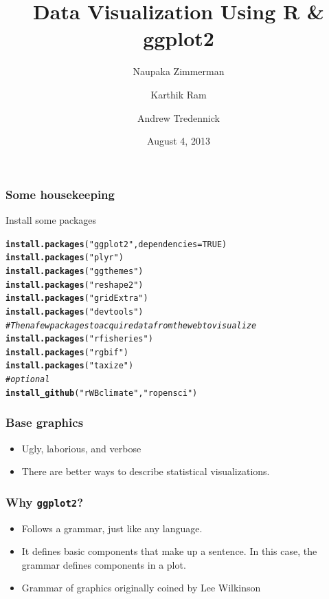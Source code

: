 \documentclass{beamer}\usepackage[]{graphicx}\usepackage[]{color}
\makeatletter
\newcommand{\hlstr}[1]{\textcolor[rgb]{0.192,0.494,0.8}{#1}}%
\newcommand{\hlcom}[1]{\textcolor[rgb]{0.678,0.584,0.686}{\textit{#1}}}%
\newcommand{\hlkwd}[1]{\textcolor[rgb]{0.737,0.353,0.396}{\textbf{#1}}}%
\newenvironment{kframe}{%
 \def\at@end@of@kframe{}%
 \ifinner\ifhmode%
  \def\at@end@of@kframe{\end{minipage}}%
  \begin{minipage}{\columnwidth}%
 \fi\fi%
 \def\FrameCommand##1{\hskip\@totalleftmargin \hskip-\fboxsep
 \colorbox{shadecolor}{##1}\hskip-\fboxsep
     \hskip-\linewidth \hskip-\@totalleftmargin \hskip\columnwidth}%
 \MakeFramed {\advance\hsize-\width
   \@totalleftmargin\z@ \linewidth\hsize
   \@setminipage}}%
 {\par\unskip\endMakeFramed%
 \at@end@of@kframe}
\newenvironment{knitrout}{}{} %
\makeatother
\begin{document}


\title{Data Visualization Using R \& ggplot2}
\author{Naupaka Zimmerman \and Karthik Ram \and Andrew Tredennick}
\date{August 4, 2013}
\maketitle


\begin{frame}[fragile]
\frametitle{Some housekeeping}
Install some packages
\begin{knitrout}\footnotesize
{}\color{fgcolor}\begin{kframe}
\begin{alltt}
\hlkwd{install.packages}(\hlstr{"ggplot2"}, dependencies = TRUE)
\hlkwd{install.packages}(\hlstr{"plyr"})
\hlkwd{install.packages}(\hlstr{"ggthemes"})
\hlkwd{install.packages}(\hlstr{"reshape2"})
\hlkwd{install.packages}(\hlstr{"gridExtra"})
\hlkwd{install.packages}(\hlstr{"devtools"})
\hlcom{# Then a few packages to acquire data from the web to visualize}
\hlkwd{install.packages}(\hlstr{"rfisheries"})
\hlkwd{install.packages}(\hlstr{"rgbif"})
\hlkwd{install.packages}(\hlstr{"taxize"})
\hlcom{# optional}
\hlkwd{install_github}(\hlstr{"rWBclimate"}, \hlstr{"ropensci"})
\end{alltt}
\end{kframe}
\end{knitrout}

\end{frame}


\begin{frame}[fragile]
\frametitle{Base graphics}
\begin{itemize}
\item Ugly, laborious, and verbose\\
\item There are better ways to describe statistical visualizations.\\
\end{itemize}
\end{frame}

\begin{frame}[fragile]
\frametitle{Why \texttt{ggplot2}?}
\begin{itemize}
\item Follows a grammar, just like any language.
\item It defines basic components that make up a sentence. In this case, the grammar defines components in a plot.
\item Grammar of graphics originally coined by Lee Wilkinson
\end{itemize}
\end{frame}
\end{document}
